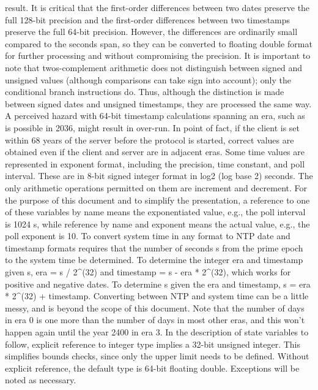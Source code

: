  result. It is critical that the first-order differences between two
 dates preserve the full 128-bit precision and the first-order
 differences between two timestamps preserve the full 64-bit
 precision. However, the differences are ordinarily small compared to
 the seconds span, so they can be converted to floating double format
 for further processing and without compromising the precision.
 It is important to note that twos-complement arithmetic does not
 distinguish between signed and unsigned values (although comparisons
 can take sign into account); only the conditional branch instructions
 do. Thus, although the distinction is made between signed dates and
 unsigned timestamps, they are processed the same way. A perceived
 hazard with 64-bit timestamp calculations spanning an era, such as is
 possible in 2036, might result in over-run. In point of fact, if the
 client is set within 68 years of the server before the protocol is
 started, correct values are obtained even if the client and server
 are in adjacent eras.
 Some time values are represented in exponent format, including the
 precision, time constant, and poll interval. These are in 8-bit
 signed integer format in log2 (log base 2) seconds. The only
 arithmetic operations permitted on them are increment and decrement.
 For the purpose of this document and to simplify the presentation, a
 reference to one of these variables by name means the exponentiated
 value, e.g., the poll interval is 1024 s, while reference by name and
 exponent means the actual value, e.g., the poll exponent is 10.
 To convert system time in any format to NTP date and timestamp
 formats requires that the number of seconds s from the prime epoch to
 the system time be determined. To determine the integer era and
 timestamp given s,
 era = s / 2^(32) and timestamp = s - era * 2^(32),
 which works for positive and negative dates. To determine s given
 the era and timestamp,
 s = era * 2^(32) + timestamp.
 Converting between NTP and system time can be a little messy, and is
 beyond the scope of this document. Note that the number of days in
 era 0 is one more than the number of days in most other eras, and
 this won’t happen again until the year 2400 in era 3.
In the description of state variables to follow, explicit reference
 to integer type implies a 32-bit unsigned integer. This simplifies
 bounds checks, since only the upper limit needs to be defined.
 Without explicit reference, the default type is 64-bit floating
 double. Exceptions will be noted as necessary.
